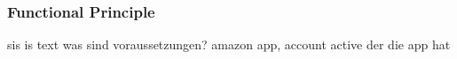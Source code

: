 \subsubsection{Functional Principle}\label{subsection:license-amazon-functional}
sis is text
was sind voraussetzungen? amazon app, account active der die app hat\newline
